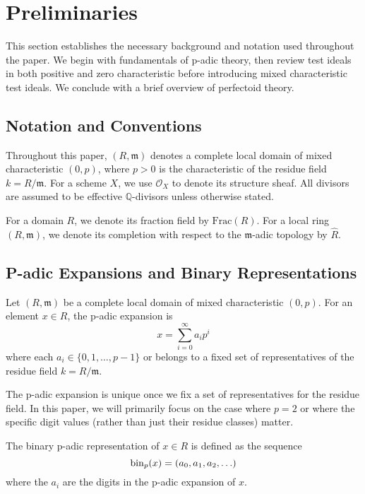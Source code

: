 \section{Preliminaries}\label{sec:preliminaries}

This section establishes the necessary background and notation used throughout the paper. We begin with fundamentals of p-adic theory, then review test ideals in both positive and zero characteristic before introducing mixed characteristic test ideals. We conclude with a brief overview of perfectoid theory.

\subsection{Notation and Conventions}

Throughout this paper, $(R,\mathfrak{m})$ denotes a complete local domain of mixed characteristic $(0,p)$, where $p > 0$ is the characteristic of the residue field $k = R/\mathfrak{m}$. For a scheme $X$, we use $\mathcal{O}_X$ to denote its structure sheaf. All divisors are assumed to be effective $\mathbb{Q}$-divisors unless otherwise stated.

For a domain $R$, we denote its fraction field by $\text{Frac}(R)$. For a local ring $(R, \mathfrak{m})$, we denote its completion with respect to the $\mathfrak{m}$-adic topology by $\hat{R}$.

\subsection{P-adic Expansions and Binary Representations}

\begin{definition}\label{def:p-adic-expansion}
Let $(R,\mathfrak{m})$ be a complete local domain of mixed characteristic $(0,p)$. For an element $x \in R$, the p-adic expansion is
$$x = \sum_{i=0}^{\infty} a_i p^i$$
where each $a_i \in \{0,1,\ldots,p-1\}$ or belongs to a fixed set of representatives of the residue field $k = R/\mathfrak{m}$.
\end{definition}

The p-adic expansion is unique once we fix a set of representatives for the residue field. In this paper, we will primarily focus on the case where $p=2$ or where the specific digit values (rather than just their residue classes) matter.

\begin{definition}\label{def:binary-representation}
The binary p-adic representation of $x \in R$ is defined as the sequence
$$\operatorname{bin}_p(x) = (a_0, a_1, a_2, \ldots)$$
where the $a_i$ are the digits in the p-adic expansion of $x$.
\end{definition}

